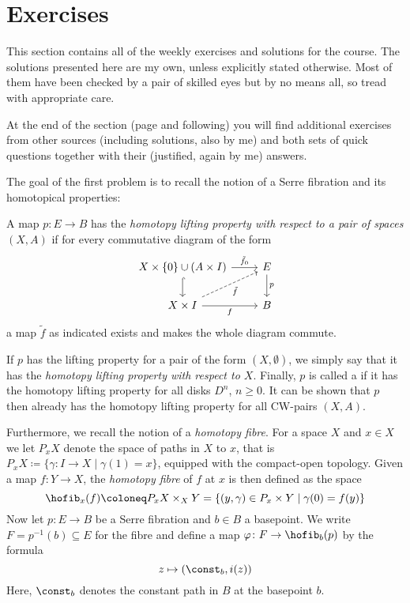 \section{Exercises}
This section contains all of the weekly exercises and solutions for the course.
The solutions presented here are my own, unless explicitly stated otherwise.
Most of them have been checked by a pair of skilled eyes but by no means all, so tread with appropriate care.

At the end of the section (page \pageref{sect:quickquest} and following) you will find additional exercises from other sources (including solutions, also by me) and both sets of quick questions together with their (justified, again by me) answers.

\begin{exercise}\label{ex:serrefib}
	The goal of the first problem is to recall the notion of a Serre fibration and its homotopical properties:

	A map $p\colon E \to B$ has the \emph{homotopy lifting property with respect to a pair of spaces $(X, A)$} if for every commutative diagram of the form
	\begin{equation*}
		\begin{tikzcd}
			X \times \{0\} \cup (A \times I)
					\ar[r, "\tilde{f}_0"]
					\ar[d, hook]
				& E
					\ar[d, "p"]
			\\
			X \times I
					\ar[r, swap, "f"]
					\ar[ur, dashed, swap, "\tilde{f}"]
				& B
		\end{tikzcd}
	\end{equation*}
	a map $\tilde{f}$ as indicated exists and makes the whole diagram commute.

	If $p$ has the lifting property for a pair of the form $(X, \emptyset)$, we simply say that it has the \emph{homotopy lifting property with respect to $X$}.
	Finally, $p$ is called a  if it has the homotopy lifting property for all disks $D^n$, $n \geq 0$.
	It can be shown that $p$ then already has the homotopy lifting property for all CW-pairs $(X, A)$.

	Furthermore, we recall the notion of a \emph{homotopy fibre}.
	For a space $X$ and $x \in X$ we let $P_x X$ denote the space of paths in $X$ to $x$, that is $P_x X \coloneq \{\gamma\colon I \to X \mid \gamma(1) = x\}$, equipped with the compact-open topology.
	Given a map $f\colon Y \to X$, the \emph{homotopy fibre} of $f$ at $x$ is then defined as the space
	\begin{equation*}
		\hofib_x(f) \coloneq P_x X \times_X Y = \{(y, \gamma) \in P_x \times Y \mid \gamma(0) = f(y)\}
	\end{equation*}
	Now let $p\colon E \to B$ be a Serre fibration and $b \in B$ a basepoint.
	We write $F = p^{-1}(b) \subseteq E$ for the fibre and define a map $\varphi\colon F \to \hofib_b(p)$ by the formula  
	\begin{equation*}
		z \mapsto (\const_b, i(z))
	\end{equation*}
	Here, $\const_b$ denotes the constant path in $B$ at the basepoint $b$.


\end{exercise}
